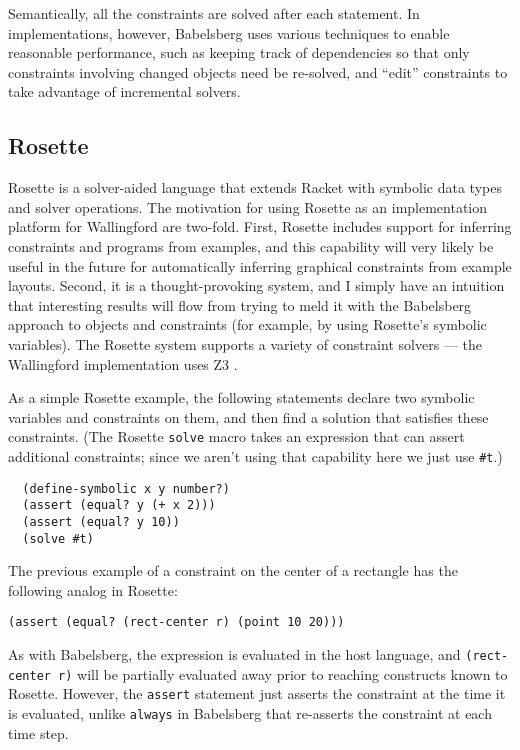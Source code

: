 \documentclass[reprint]{sigplanconf}
\begin{document}
Semantically, all the constraints are solved after each statement.  In
implementations, however, Babelsberg uses various techniques to enable
reasonable performance, such as keeping track of dependencies so that only
constraints involving changed objects need be re-solved, and ``edit''
constraints to take advantage of incremental solvers.

\subsection{Rosette}
\label{sec:rosette}

Rosette is a solver-aided 
language that extends Racket \cite{racket} with
symbolic data types and solver operations.  The motivation for using
Rosette as an implementation platform for Wallingford are two-fold.  First,
Rosette includes support for inferring constraints and programs from
examples, and this capability will very likely be useful in the future for
automatically inferring graphical constraints from example layouts.
Second, it is a thought-provoking system, and I simply have
an intuition that interesting results will flow from trying to meld it with
the Babelsberg approach to objects and constraints (for example, by
using Rosette's symbolic variables).
The Rosette system supports a variety of constraint solvers --- the
Wallingford implementation uses Z3 \cite{demoura-z3-2008}.

As a simple Rosette example, the following statements declare two
symbolic variables and constraints on them, and then find a solution
that satisfies these constraints.  (The Rosette \verb|solve| macro
takes an expression that can assert additional constraints; since we
aren't using that capability here we just use \verb|#t|.)

\begin{verbatim}
  (define-symbolic x y number?)
  (assert (equal? y (+ x 2)))
  (assert (equal? y 10))
  (solve #t)
\end{verbatim}

The previous example of a constraint on the center of a rectangle has
the following analog in Rosette:

\begin{verbatim}
(assert (equal? (rect-center r) (point 10 20)))
\end{verbatim}

As with Babelsberg, the expression is evaluated in the host language, and
\verb|(rect-center r)| will be partially evaluated away prior to reaching
constructs known to Rosette.  
However, the \verb|assert| statement just asserts the constraint at the
time it is evaluated, unlike \verb|always| in Babelsberg that re-asserts
the constraint at each time step.
\end{document}
